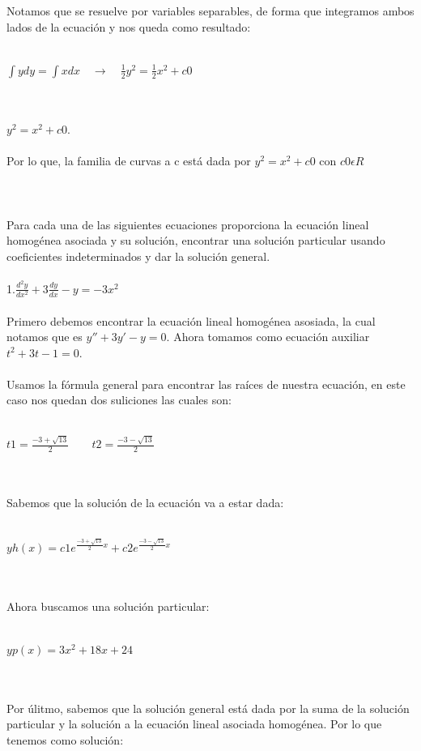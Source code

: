 \documentclass[a4paper,10pt]{article}
\begin{document}
Notamos que se resuelve por variables separables, de forma que integramos ambos lados de la ecuación y nos queda como resultado:\\\\
\centerline{$\int y dy = \int x dx   \quad\rightarrow\quad \frac{1}{2} y^2 = \frac{1}{2} x^2  + c0$}\\\\
$y^2 = x^2 + c0$.\\\\
Por lo que, la familia de curvas a c está dada por $y^2 = x^2 + c0$  con $c0\epsilon R $\\\\\\\\
Para cada una de las siguientes ecuaciones proporciona la ecuación
lineal homogénea asociada y su solución, encontrar una solución
particular usando coeficientes indeterminados y dar la solución
general.\\\\
1.$\frac{d^2y}{dx^2}+ 3 \frac{dy}{dx} - y = -3x^2$\\\\
Primero debemos encontrar la ecuación lineal homogénea asosiada, la cual notamos que es $y'' + 3y' - y=0 $. Ahora tomamos como ecuación auxiliar $t^2 + 3t - 1 =0$.\\\\
Usamos la fórmula general para encontrar las raíces de nuestra ecuación, en este caso nos quedan dos suliciones las cuales son:\\\\
\centerline{$t1= \frac{-3+  \sqrt{13}}{2} \quad\quad t2=\frac{-3-\sqrt{13}}{2}$ }\\\\
Sabemos que la solución de la ecuación va a estar dada:\\\\
\centerline{$yh(x)= c1 e^{\frac{-3+  \sqrt{13}}{2}x} + c2 e^{\frac{-3-\sqrt{13}}{2}x}$}\\\\
Ahora buscamos una solución particular:\\\\
\centerline{$yp(x)= 3x^2 + 18x +24$ }\\\\
Por úlitmo, sabemos que la solución general está dada por la suma de la solución particular y la solución a la ecuación lineal asociada homogénea. Por lo que tenemos como solución:\\\\
\end{document}
